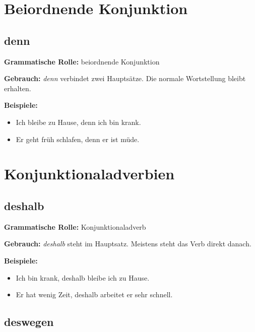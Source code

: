 \documentclass[a4paper]{article}
\begin{document}
    
    \section{Beiordnende Konjunktion}
        
        \subsection{denn}
            
            \textbf{Grammatische Rolle:} beiordnende Konjunktion
            
            \textbf{Gebrauch:} \emph{denn} verbindet zwei Hauptsätze. Die normale Wortstellung bleibt erhalten.
            
            \textbf{Beispiele:}
            \begin{itemize}
                \item Ich bleibe zu Hause, denn ich bin krank.
                \item Er geht früh schlafen, denn er ist müde.
            \end{itemize}
    
    
    \section{Konjunktionaladverbien}
        
        \subsection{deshalb}
            
            \textbf{Grammatische Rolle:} Konjunktionaladverb
            
            \textbf{Gebrauch:} \emph{deshalb} steht im Hauptsatz. Meistens steht das Verb direkt danach.
            
            \textbf{Beispiele:}
            \begin{itemize}
                \item Ich bin krank, deshalb bleibe ich zu Hause.
                \item Er hat wenig Zeit, deshalb arbeitet er sehr schnell.
            \end{itemize}
        
        \subsection{deswegen}
            
\end{document}
